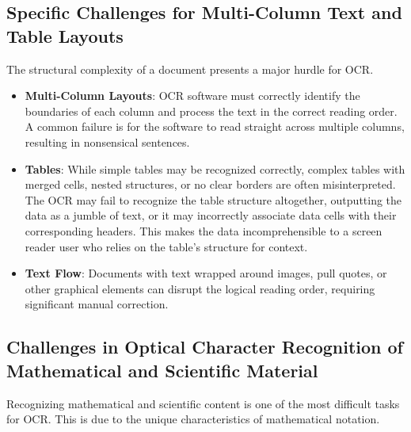 \subsection{Specific Challenges for Multi-Column Text and Table Layouts}
\label{subsec:ocr-layout-challenges}
The structural complexity of a document presents a major hurdle for OCR.
\begin{itemize}
	\item \textbf{Multi-Column Layouts}: OCR software must correctly identify the boundaries of each column and process the text in the correct reading order. A common failure is for the software to read straight across multiple columns, resulting in nonsensical sentences.
	\item \textbf{Tables}: While simple tables may be recognized correctly, complex tables with merged cells, nested structures, or no clear borders are often misinterpreted. The OCR may fail to recognize the table structure altogether, outputting the data as a jumble of text, or it may incorrectly associate data cells with their corresponding headers. This makes the data incomprehensible to a screen reader user who relies on the table's structure for context.
	\item \textbf{Text Flow}: Documents with text wrapped around images, pull quotes, or other graphical elements can disrupt the logical reading order, requiring significant manual correction.
\end{itemize}

\subsection{Challenges in Optical Character Recognition of Mathematical and Scientific Material}
\label{ssubsec:ocr-math-challenges}
Recognizing mathematical and scientific content is one of the most difficult tasks for OCR. This is due to the unique characteristics of mathematical notation.

